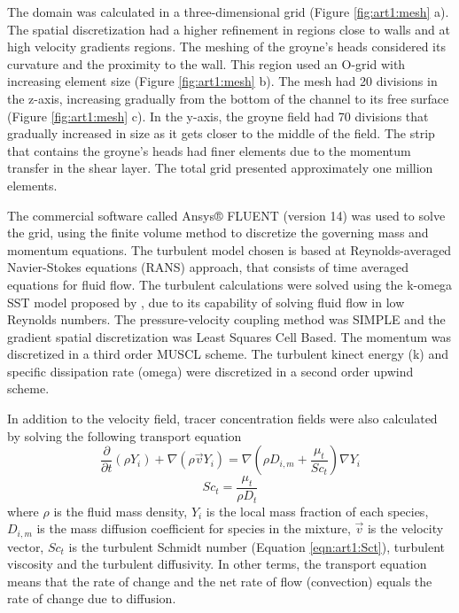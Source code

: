 The domain was calculated in a three-dimensional grid (Figure \ref{fig:art1:mesh} a). The spatial discretization had a higher refinement in regions close to walls and at high velocity gradients regions. The meshing of the groyne’s heads considered its curvature and the proximity to the wall. This region used an O-grid with increasing element size (Figure \ref{fig:art1:mesh} b). The mesh had 20 divisions in the z-axis, increasing gradually from the bottom of the channel to its free surface (Figure \ref{fig:art1:mesh} c). In the y-axis, the groyne field had 70 divisions that gradually increased in size as it gets closer to the middle of the field. The strip that contains the groyne’s heads had finer elements due to the momentum transfer in the shear layer. The total grid presented approximately one million elements.

The commercial software called Ansys® FLUENT (version 14) was used to solve the grid, using the finite volume method to discretize the governing mass and momentum equations. The turbulent model chosen is based at Reynolds-averaged Navier-Stokes equations (RANS) approach, that consists of time averaged equations for fluid flow. The turbulent calculations were solved using the k-omega SST model proposed by \textcite{Menter2005}, due to its capability of solving fluid flow in low Reynolds numbers. The pressure-velocity coupling method was SIMPLE and the gradient spatial discretization was Least Squares Cell Based. The momentum was discretized in a third order MUSCL scheme. The turbulent kinect energy (k) and specific dissipation rate (omega) were discretized in a second order upwind scheme.

In addition to the velocity field, tracer concentration fields were also calculated by solving the following transport equation 
\begin{equation}
\frac{\partial}{\partial t}(\rho Y_i)+\nabla (\rho \vec{v} Y_i)=\nabla (\rho D_{i,m}+\frac{\mu_t}{Sc_t})\nabla Y_i
\label{eqn:art1:transportEq}
\end{equation}\begin{equation}
Sc_t = \frac{\mu_t}{\rho D_t}
\label{eqn:art1:Sct}
\end{equation}
where $\rho$ is the fluid mass density, $Y_i$ is the local mass fraction of each species, $D_{i,m}$ is the mass diffusion coefficient for species in the mixture, $\vec{v}$ is the velocity vector, $Sc_t$ is the turbulent Schmidt number (Equation \ref{eqn:art1:Sct}),  turbulent viscosity and  the turbulent diffusivity. In other terms, the transport equation means that the rate of change and the net rate of flow (convection) equals the rate of change due to diffusion.


